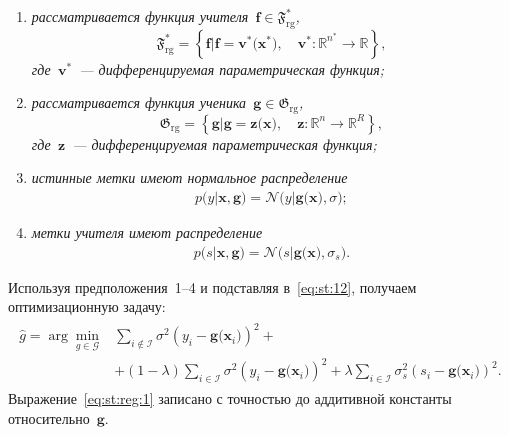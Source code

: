 \documentclass{dissert}
\begin{document}
\begin{enumerate}[1)]
	\item \emph{рассматривается функция учителя~$\mathbf{f}\in\mathfrak{F}_{\text{rg}}^{*}$,
	\[
	\mathfrak{F}_{\text{rg}}^* = \left\{\mathbf{f}| \mathbf{f} = \mathbf{v}^*\bigr(\mathbf{x}^*\bigr), \quad \mathbf{v}^*: \mathbb{R}^{n^*} \to \mathbb{R} \right\},
	\]
	где~$\mathbf{v}^*$~--- дифференцируемая параметрическая функция;}
	\item \emph{рассматривается функция ученика~$\mathbf{g}\in\mathfrak{G}_{\text{rg}}$,
    \[
    \mathfrak{G}_{\text{rg}} = \left\{\mathbf{g}| \mathbf{g} = \mathbf{z}\bigr(\mathbf{x}\bigr), \quad \mathbf{z}: \mathbb{R}^n \to \mathbb{R}^R \right\},
    \]
    где~$\mathbf{z}$~--- дифференцируемая параметрическая функция;}
	\item \emph{истинные метки имеют нормальное распределение
	\begin{gather}
		p\bigr(y|\mathbf{x}, \mathbf{g}\bigr) = \mathcal{N}\bigr(y|\mathbf{g}\bigr(\mathbf{x}\bigr), \sigma\bigr);
	\end{gather}}
	\item \emph{метки учителя имеют распределение
	\begin{gather}
		p\bigr(s| \mathbf{x}, \mathbf{g}\bigr) = \mathcal{N}\bigr(s|\mathbf{g}\bigr(\mathbf{x}\bigr), \sigma_s\bigr).
	\end{gather}}
\end{enumerate}
Используя предположения~1--4 и подставляя в~\eqref{eq:st:12}, получаем оптимизационную задачу:
\begin{gather}
\label{eq:st:reg:1}
\begin{aligned}
\hat{g} = \arg\min_{g\in \mathcal{G}} & \sum_{i\not\in \mathcal{I}}\sigma^2\left(y_i-\mathbf{g}\bigr(\mathbf{x}_i\bigr)\right)^2 +\\
&+ \left(1-\lambda\right)\sum_{i\in \mathcal{I}}\sigma^2\left(y_i-\mathbf{g}\bigr(\mathbf{x}_i\bigr)\right)^2 + \lambda\sum_{i\in \mathcal{I}}\sigma_s^2\left(s_i-\mathbf{g}\bigr(\mathbf{x}_i\bigr)\right)^2.
\end{aligned}
\end{gather}
Выражение~\eqref{eq:st:reg:1} записано с точностью до аддитивной константы относительно~$\mathbf{g}$. 
\end{document}
